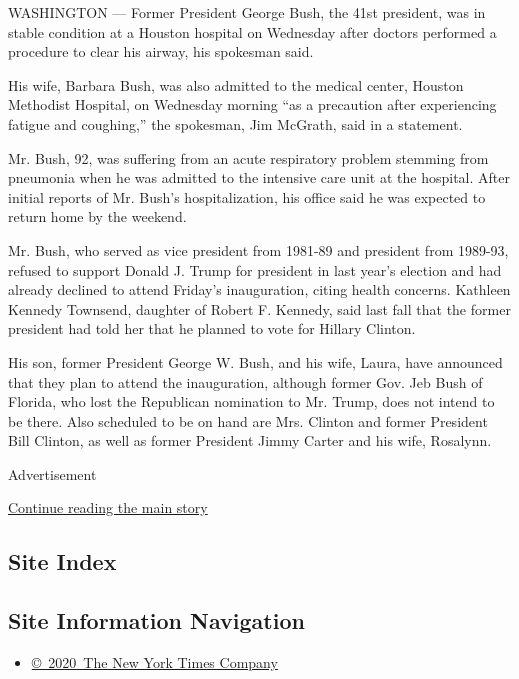 WASHINGTON --- Former President George Bush, the 41st president, was in
stable condition at a Houston hospital on Wednesday after doctors
performed a procedure to clear his airway, his spokesman said.

His wife, Barbara Bush, was also admitted to the medical center, Houston
Methodist Hospital, on Wednesday morning ``as a precaution after
experiencing fatigue and coughing,'' the spokesman, Jim McGrath, said in
a statement.

Mr. Bush, 92, was suffering from an acute respiratory problem stemming
from pneumonia when he was admitted to the intensive care unit at the
hospital. After initial reports of Mr. Bush's hospitalization, his
office said he was expected to return home by the weekend.

Mr. Bush, who served as vice president from 1981-89 and president from
1989-93, refused to support Donald J. Trump for president in last year's
election and had already declined to attend Friday's inauguration,
citing health concerns. Kathleen Kennedy Townsend, daughter of Robert F.
Kennedy, said last fall that the former president had told her that he
planned to vote for Hillary Clinton.

His son, former President George W. Bush, and his wife, Laura, have
announced that they plan to attend the inauguration, although former
Gov. Jeb Bush of Florida, who lost the Republican nomination to Mr.
Trump, does not intend to be there. Also scheduled to be on hand are
Mrs. Clinton and former President Bill Clinton, as well as former
President Jimmy Carter and his wife, Rosalynn.

Advertisement

\protect\hyperlink{after-bottom}{Continue reading the main story}

\hypertarget{site-index}{%
\subsection{Site Index}\label{site-index}}

\hypertarget{site-information-navigation}{%
\subsection{Site Information
Navigation}\label{site-information-navigation}}

\begin{itemize}
\tightlist
\item
  \href{https://help.nytimes3xbfgragh.onion/hc/en-us/articles/115014792127-Copyright-notice}{©~2020~The
  New York Times Company}
\end{itemize}

